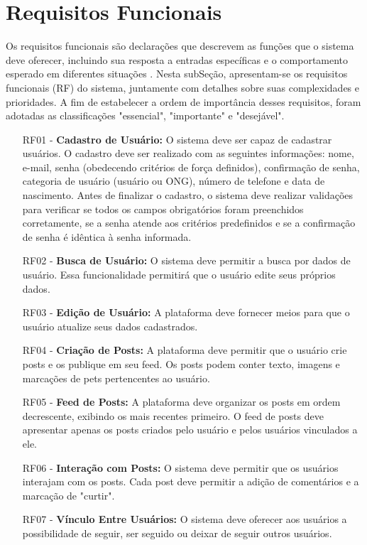 \section{Requisitos Funcionais}
Os requisitos funcionais são declarações que descrevem as funções que o sistema deve oferecer, incluindo sua resposta a entradas específicas e o comportamento esperado em diferentes situações \cite[p,83]{Sommerville}. Nesta subSeção, apresentam-se os requisitos funcionais (RF) do sistema, juntamente com detalhes sobre suas complexidades e prioridades. A fim de estabelecer a ordem de importância desses requisitos, foram adotadas as classificações "essencial", "importante" e "desejável".
\begin{itemize}[leftmargin=2cm]
\item[RF01 -] {\bf Cadastro de Usuário:} O sistema deve ser capaz de cadastrar usuários. O cadastro deve ser realizado com as seguintes informações: nome, e-mail, senha (obedecendo critérios de força definidos), confirmação de senha, categoria de usuário (usuário ou ONG), número de telefone e data de nascimento. Antes de finalizar o cadastro, o sistema deve realizar validações para verificar se todos os campos obrigatórios foram preenchidos corretamente, se a senha atende aos critérios predefinidos e se a confirmação de senha é idêntica à senha informada.
\item[RF02 -] {\bf Busca de Usuário:} O sistema deve permitir a busca por dados de usuário. Essa funcionalidade permitirá que o usuário edite seus próprios dados.
\item[RF03 -] {\bf Edição de Usuário:} A plataforma deve fornecer meios para que o usuário atualize seus dados cadastrados.
\item[RF04 -] {\bf Criação de Posts:} A plataforma deve permitir que o usuário crie posts e os publique em seu feed. Os posts podem conter texto, imagens e marcações de pets pertencentes ao usuário.
\item[RF05 -] {\bf Feed de Posts:} A plataforma deve organizar os posts em ordem decrescente, exibindo os mais recentes primeiro. O feed de posts deve apresentar apenas os posts criados pelo usuário e pelos usuários vinculados a ele.
\item[RF06 -] {\bf Interação com Posts:} O sistema deve permitir que os usuários interajam com os posts. Cada post deve permitir a adição de comentários e a marcação de "curtir".
\item[RF07 -] {\bf Vínculo Entre Usuários:}  O sistema deve oferecer aos usuários a possibilidade de seguir, ser seguido ou deixar de seguir outros usuários.

\end{itemize}
